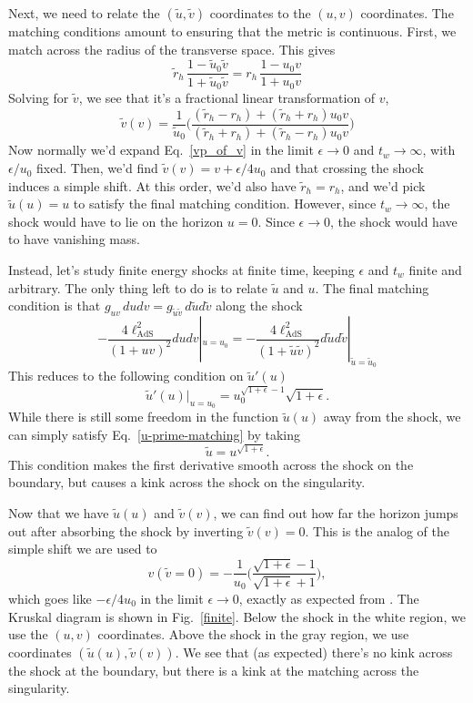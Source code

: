 \documentclass[12pt]{article}
\numberwithin{equation}{section}
\newcommand{\be}{\begin{equation}}
\newcommand{\ee}{\end{equation}}
\newcommand{\lads}{\ell_{\text{AdS}}}
\renewcommand{\eqref}[1]{Eq.~\ref{#1}}
\begin{document}
Next, we need to relate the $(\tilde{u}, \tilde{v})$ coordinates to the $(u,v)$ coordinates. The matching conditions \cite{Dray:1985yt} amount to ensuring that the metric is continuous. First, we match across the radius of the transverse space. This gives
\be
\tilde{r}_{h}\, \frac{1 - \tilde{u}_0 \tilde{v} }{1+\tilde{u}_0 \tilde{v} } = r_{h}\, \frac{1 - u_0 v}{1+u_0 v} \label{matching}
\ee
Solving for $\tilde{v}$, we see that it's a fractional linear transformation of $v$,
\be
\tilde{v}(v) = \frac{1}{\tilde{u}_0}\bigg(\frac{(\tilde{r}_{h}-r_{h}) +  (\tilde{r}_{h}+r_{h})u_0 v}{   (\tilde{r}_{h}+r_{h}) + (\tilde{r}_{h}-r_{h})u_0v}\bigg) \label{vp_of_v}
\ee
Now normally we'd expand \eqref{vp_of_v} in the limit $\epsilon\to0$ and $t_w\to \infty$, with $\epsilon / u_0$ fixed. Then, we'd find $\tilde{v}(v) = v + \epsilon / 4u_0$ and that crossing the shock induces a simple shift. At this order, we'd also have $\tilde{r}_{h} = r_{h}$, and  we'd  pick $\tilde{u}(u) = u$ to satisfy the final matching condition. However, since $t_w\to \infty$, the shock would have to lie on the horizon $u=0$. Since $\epsilon\to0$, the shock would have to have vanishing mass.

Instead, let's study finite energy shocks at finite time, keeping $\epsilon$ and $t_w$ finite and arbitrary. The only thing left to do is to relate $\tilde{u}$ and $u$. The final matching condition \cite{Dray:1985yt} is that $g_{uv}\, du dv = g_{\tilde{u}\tilde{v}} \, d\tilde{u}d\tilde{v}$ along the shock
\be
-\frac{4 \lads^2}{(1+uv)^2}dudv|_{u=u_0} = -\frac{4 \lads^2}{(1+\tilde{u}\tilde{v})^2}d\tilde{u}d\tilde{v}|_{\tilde{u}=\tilde{u}_0}
\ee
This reduces to the following condition on $\tilde{u}'(u)$
\be
\tilde{u}'(u)|_{u=u_0} = u_0^{\sqrt{1+\epsilon}-1}\sqrt{1+ \epsilon}. \label{u-prime-matching}
\ee
While there is still some freedom in the function $\tilde{u}(u)$ away from the shock, we can simply satisfy \eqref{u-prime-matching} by taking
\be
\tilde{u} = u^{\sqrt{1+\epsilon}}. \label{up_of_u}
\ee
This condition makes the first derivative smooth across the shock on the boundary, but causes a kink across the shock on the singularity.

Now that we have $\tilde{u}(u)$ and $\tilde{v}(v)$, we can find out how far the horizon jumps out after absorbing the shock by inverting $\tilde{v}(v) = 0$. This is the analog of the simple shift we are used to
\be
v(\tilde{v}=0) = -\frac{1}{u_0}\bigg( \frac{\sqrt{1+\epsilon}- 1}{\sqrt{1+ \epsilon} +1} \bigg), \label{tilde-shift}
\ee
which goes like $- \epsilon / 4 u_0$ in the limit $\epsilon \to 0$, exactly as expected from \cite{shock}.
The Kruskal diagram is shown in  Fig.~\ref{finite}. Below the shock in the white region, we use the $(u,v)$ coordinates. Above the shock in the gray region, we use coordinates $(\tilde{u}(u), \tilde{v}(v))$.   We see that (as expected) there's no kink across the shock at the boundary, but there is a kink at the matching across the singularity.
\end{document}
